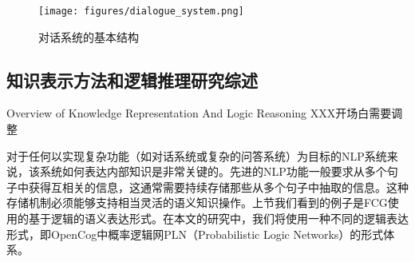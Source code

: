 \begin{figure}[htb]
\centering
\texttt{[image: figures/dialogue\_system.png]}
\caption{对话系统的基本结构}
\label{fig:dialogue}
\end{figure}


\subsection{知识表示方法和逻辑推理研究综述}{Overview of Knowledge Representation And Logic Reasoning}
\label{sec:representationReview}
XXX开场白需要调整

对于任何以实现复杂功能（如对话系统或复杂的问答系统）为目标的NLP系统来说，该系统如何表达内部知识是非常关键的。先进的NLP功能一般要求从多个句子中获得互相关的信息，这通常需要持续存储那些从多个句子中抽取的信息。这种存储机制必须能够支持相当灵活的语义知识操作。上节我们看到的例子是FCG使用的基于逻辑的语义表达形式。在本文的研究中，我们将使用一种不同的逻辑表达形式，即OpenCog中概率逻辑网PLN（Probabilistic Logic Networks）的形式体系。


